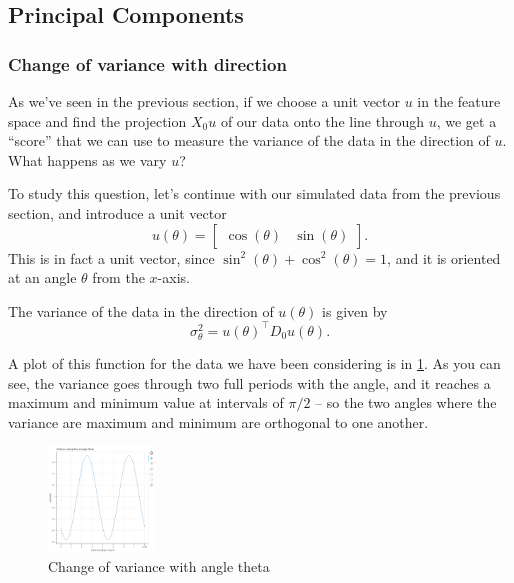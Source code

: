 \documentclass[
]{article}
\begin{document}
\hypertarget{principal-components}{%
\subsection{Principal Components}\label{principal-components}}

\hypertarget{change-of-variance-with-direction}{%
\subsubsection{Change of variance with
direction}\label{change-of-variance-with-direction}}

As we've seen in the previous section, if we choose a unit vector \(u\)
in the feature space and find the projection \(X_{0}u\) of our data onto
the line through \(u\), we get a ``score'' that we can use to measure
the variance of the data in the direction of \(u\). What happens as we
vary \(u\)?

To study this question, let's continue with our simulated data from the
previous section, and introduce a unit vector \[
u(\theta) = \left[\begin{matrix} \cos(\theta) & \sin(\theta)\end{matrix}\right].
\] This is in fact a unit vector, since
\(\sin^2(\theta)+\cos^2(\theta)=1\), and it is oriented at an angle
\(\theta\) from the \(x\)-axis.

The variance of the data in the direction of \(u(\theta)\) is given by
\[
\sigma_{\theta}^2 = u(\theta)^{\intercal}D_{0}u(\theta).
\]

A plot of this function for the data we have been considering is in
\cref{fig:pcatheta}. As you can see, the variance goes through two full
periods with the angle, and it reaches a maximum and minimum value at
intervals of \(\pi/2\) -- so the two angles where the variance are
maximum and minimum are orthogonal to one another.

\begin{figure}
\hypertarget{fig:pcatheta}{%
\centering
\includegraphics[width=0.25\textwidth,height=\textheight]{../img/PCAtheta.png}
\caption{Change of variance with angle theta}\label{fig:pcatheta}
}
\end{figure}
\end{document}

